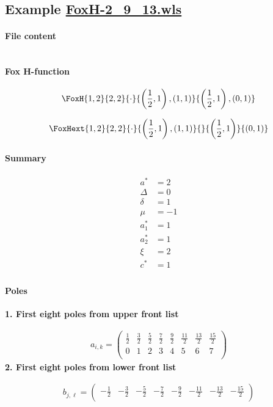 \documentclass[preview]{standalone}
\begin{document}
\subsection{Example \url{FoxH-2_9_13.wls}}

\paragraph{File content}

\inputminted{text}{../Examples/FoxH-2_9_13.wls}

\paragraph{Fox H-function}

\begin{align*}
  \FoxH
    {1,2}
    {2,2}
    {\cdot}
    {\left(\frac{1}{2}, 1\right), \left(1, 1\right)}
    {\left(\frac{1}{2}, 1\right), \left(0, 1\right)}
\end{align*}

\begin{align*}
  \FoxHext
    {1,2}
    {2,2}
    {\cdot}
    {\left(\frac{1}{2}, 1\right), \left(1, 1\right)}
    {}
    {\left(\frac{1}{2}, 1\right)}
    {\left(0, 1\right)}
\end{align*}

\paragraph{Summary}

\begin{align*}
  a^*    & = 2 \\
  \Delta & = 0 \\
  \delta & = 1 \\
  \mu    & = -1 \\
  a_1^*  & = 1 \\
  a_2^*  & = 1 \\
  \xi    & = 2 \\
  c^*    & = 1 \\
\end{align*}

\paragraph{Poles}

\noindent\textbf{1. First eight poles from upper front list}

\begin{align*}
  a_{i,k} = 
  \left(
\begin{array}{cccccccc}
 \frac{1}{2} & \frac{3}{2} & \frac{5}{2} & \frac{7}{2} & \frac{9}{2} & \frac{11}{2} & \frac{13}{2} & \frac{15}{2} \\
 0 & 1 & 2 & 3 & 4 & 5 & 6 & 7 \\
\end{array}
\right)
\end{align*}
\noindent\textbf{2. First eight poles from lower front list}

\begin{align*}
  b_{j,\ell} = 
  \left(
\begin{array}{cccccccc}
 -\frac{1}{2} & -\frac{3}{2} & -\frac{5}{2} & -\frac{7}{2} & -\frac{9}{2} & -\frac{11}{2} & -\frac{13}{2} & -\frac{15}{2} \\
\end{array}
\right)
\end{align*}
\end{document}
